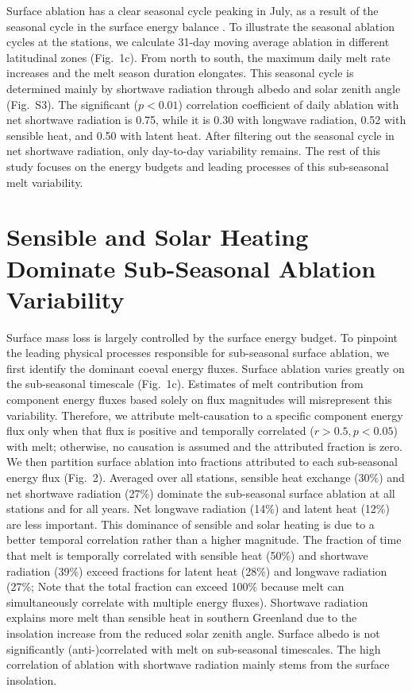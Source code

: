 \documentclass[draft]{agujournal2019}
\begin{document}
Surface ablation has a clear seasonal cycle peaking in July, 
as a result of the seasonal cycle in 
the surface energy balance \cite{VandenBroeke2011}. 
To illustrate the seasonal ablation cycles at the stations, 
we calculate 31-day moving average ablation 
in different latitudinal zones (Fig.~1c). 
From north to south, the maximum daily melt rate increases 
and the melt season duration elongates. 
This seasonal cycle is determined mainly 
by shortwave radiation through albedo and solar zenith angle (Fig.~S3). 
The significant ($p<0.01$) correlation coefficient of 
daily ablation with net shortwave radiation is 0.75, 
while it is 0.30 with longwave radiation, 
0.52 with sensible heat, and 0.50 with latent heat. 
After filtering out the seasonal cycle in net shortwave radiation, 
only day-to-day variability remains. 
The rest of this study focuses on the energy budgets 
and leading processes of this sub-seasonal melt variability. 

\section{Sensible and Solar Heating Dominate Sub-Seasonal Ablation Variability}
Surface mass loss is largely controlled by the surface energy budget. 
To pinpoint the leading physical processes responsible 
for sub-seasonal surface ablation, 
we first identify the dominant coeval energy fluxes.
Surface ablation varies greatly on the sub-seasonal timescale (Fig.~1c).
Estimates of melt contribution from 
component energy fluxes based solely on flux magnitudes 
will misrepresent this variability.
Therefore, we attribute melt-causation 
to a specific component energy flux 
only when that flux is positive and temporally correlated 
($r > 0.5, p < 0.05$) with melt; 
otherwise, no causation is assumed and the attributed fraction is zero. 
We then partition surface ablation into fractions 
attributed to each sub-seasonal energy flux (Fig.~2). 
Averaged over all stations, sensible heat exchange (30\%) 
and net shortwave radiation (27\%) 
dominate the sub-seasonal surface ablation at all stations and for all years.
Net longwave radiation (14\%) and latent heat (12\%) are less important. 
This dominance of sensible and solar heating is 
due to a better temporal correlation rather than a higher magnitude. 
The fraction of time that melt is temporally correlated with 
sensible heat (50\%) and shortwave radiation (39\%) 
exceed fractions for latent heat (28\%) and longwave radiation 
(27\%; Note that the total fraction can exceed 100\% 
because melt can simultaneously correlate with multiple energy fluxes).
Shortwave radiation explains more melt than sensible heat 
in southern Greenland due to the insolation 
increase from the reduced solar zenith angle. 
Surface albedo is not significantly (anti-)correlated 
with melt on sub-seasonal timescales. 
The high correlation of ablation with shortwave radiation 
mainly stems from the surface insolation.
\end{document}
